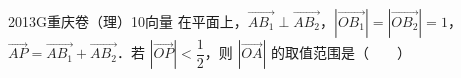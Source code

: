 
\begin{problem}{2013}{G}{重庆卷（理）}{10}{向量}
在平面上，$\overrightarrow{AB_1}\perp\overrightarrow{AB_2}$，$\left|\overrightarrow{OB_1}\right|=\left|\overrightarrow{OB_2}\right|=1$，$\overrightarrow{AP}=\overrightarrow{AB_1}+\overrightarrow{AB_2}$．若 $\left|\overrightarrow{OP}\right|<\dfrac{1}{2}$，则 $\left|\overrightarrow{OA}\right|$ 的取值范围是（　　）

\begin{choices}
\choice{{$\left(0,\dfrac{\sqrt{5}}{2}\right]$}}
\choice{{$\left(\dfrac{\sqrt{5}}{2},\dfrac{\sqrt{7}}{2}\right]$}}
\choice{{$\left(\dfrac{\sqrt{5}}{2},\sqrt{2}\right]$}}
\choice{{$\left(\dfrac{\sqrt{7}}{2},\sqrt{2}\right]$}}
\end{choices}
\end{problem}

